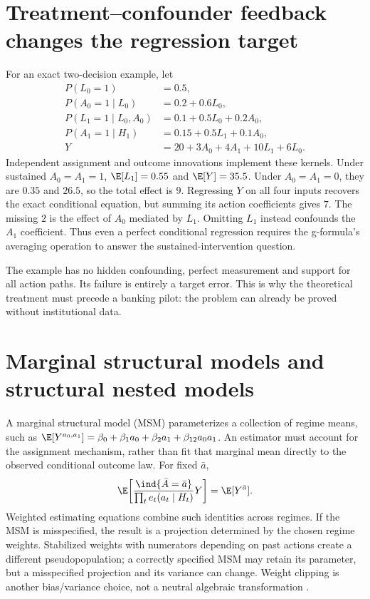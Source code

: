 \section{Treatment--confounder feedback changes the regression target}
For an exact two-decision example, let
\begin{align*}
 P(L_0=1)&=0.5,\\
 P(A_0=1\mid L_0)&=0.2+0.6L_0,\\
 P(L_1=1\mid L_0,A_0)&=0.1+0.5L_0+0.2A_0,\\
 P(A_1=1\mid H_1)&=0.15+0.5L_1+0.1A_0,\\
 Y&=20+3A_0+4A_1+10L_1+6L_0.
\end{align*}
Independent assignment and outcome innovations implement these kernels.
Under sustained $A_0=A_1=1$, $\E[L_1]=0.55$ and $\E[Y]=35.5$.
Under $A_0=A_1=0$, they are $0.35$ and $26.5$, so the total effect is
$9$. Regressing $Y$ on all four inputs recovers the exact conditional
equation, but summing its action coefficients gives $7$. The missing
$2$ is the effect of $A_0$ mediated by $L_1$. Omitting $L_1$ instead
confounds the $A_1$ coefficient. Thus even a perfect conditional
regression requires the g-formula's averaging operation to answer the
sustained-intervention question.

The example has no hidden confounding, perfect measurement and support
for all action paths. Its failure is entirely a target error. This is
why the theoretical treatment must precede a banking pilot: the problem
can already be proved without institutional data.

\section{Marginal structural models and structural nested models}
\label{r3:msm-snm}
A marginal structural model (MSM) parameterizes a collection of regime
means, such as
$\E[Y^{a_0,a_1}]=\beta_0+\beta_1a_0+\beta_2a_1+\beta_{12}a_0a_1$.
An estimator must account for the assignment mechanism, rather than fit
that marginal mean directly to the observed conditional outcome law.
For fixed $\bar a$,
\[
 \E\!\left[\frac{\ind\{\bar A=\bar a\}}
                         {\prod_t e_t(a_t\mid H_t)}Y\right]
 =\E[Y^{\bar a}].
\]
Weighted estimating equations combine such identities across regimes.
If the MSM is misspecified, the result is a projection determined by
the chosen regime weights. Stabilized weights with numerators depending
on past actions create a different pseudopopulation; a correctly
specified MSM may retain its parameter, but a misspecified projection
and its variance can change. Weight clipping is another bias/variance
choice, not a neutral algebraic transformation
\citep[Chapter 21]{hernan2020}.

